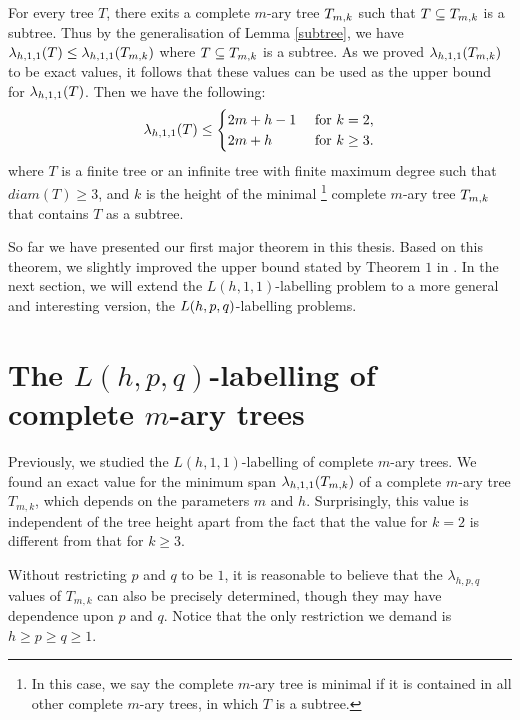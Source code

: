 \begin{remark}
For every tree $T$, there exits a complete $m$-ary tree $T_{m,k}$ such that $T \subseteq T_{m,k}$ is a subtree. Thus by the generalisation of Lemma \ref{subtree}, we have $\lamh11(T) \le \lamh11(\tmk)$ where $T \subseteq T_{m,k}$ is a subtree. As we proved $\lamh11(\tmk)$ to be exact values, it follows that these values can be used as the upper bound for $\lamh11(T)$. Then we have the following: 
\begin{align*}
\lamh11(T) \le 
\begin{cases}
2m+h-1 & \text{ for } k =2, \\
2m+h & \text{ for } k \ge 3.
\end{cases}
\end{align*}
where $T$ is a finite tree or an infinite tree with finite maximum degree such that $diam(T) \ge 3$, and $k$ is the height of the minimal \footnote{In this case, we say the complete $m$-ary tree is minimal if it is contained in all other complete $m$-ary trees, in which $T$ is a subtree.} complete $m$-ary tree $T_{m,k}$ that contains $T$ as a subtree. 
\end{remark} 

So far we have presented our first major theorem in this thesis. Based on this theorem, we slightly improved the upper bound stated by Theorem $1$ in \cite{zhou10}. In the next section, we will extend the $L(h,1,1)$-labelling problem to a more general and interesting version, the $L(h,p,q)$-labelling problems.



\section{The $L(h,p,q)$-labelling of complete $m$-ary trees}

Previously, we studied the $L(h,1,1)$-labelling of complete $m$-ary trees. We found an exact value for the minimum span $\lambda_{h,1,1}(T_{m,k})$ of a complete $m$-ary tree $T_{m,k}$, which depends on the parameters $m$ and $h$. Surprisingly, this value is independent of the tree height apart from the fact that the value for $k = 2$ is different from that for $k \ge 3$. 

Without restricting $p$ and $q$ to be $1$, it is reasonable to believe that the $\lambda_{h,p,q}$ values of $T_{m,k}$ can also be precisely determined, though  they may have dependence upon $p$ and $q$. Notice that the only restriction we demand is $h \ge p \ge q \ge 1$.

